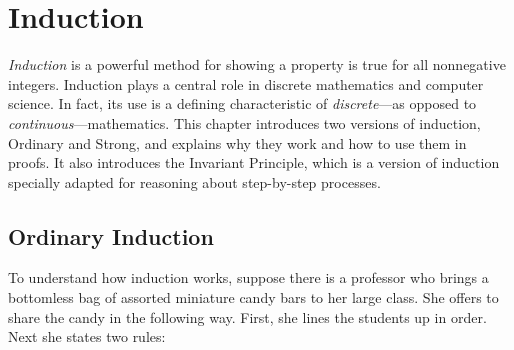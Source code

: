 \chapter{Induction}\label{induction_chap}

\emph{Induction} is a powerful method for showing a property is true
for all nonnegative integers.  Induction plays a central role in
discrete mathematics and computer science.  In fact, its use is a
defining characteristic of \emph{discrete}---as opposed to
\emph{continuous}---mathematics.  This chapter introduces two
versions of induction, Ordinary and Strong, and explains why they work
and how to use them in proofs.  It also introduces the Invariant
Principle, which is a version of induction specially adapted for
reasoning about step-by-step processes.


\iffalse
we'll introduce induction and a variant called \term{strong
induction}.  Although these two version of methods look and feel
different, it turns out that they are equivalent in the sense that a
proof using any one of the methods can be automatically reformatted so
that it becomes a proof using any of the other methods.  The choice of
which method to use is up to you and typically depends on whichever
seems to be the easiest or most natural for the problem at hand.
\fi


\section{Ordinary Induction}\label{ordinary_induct_chap}
\label{ordinary_induct_sec}

To understand how induction works, suppose there is a professor who
brings a bottomless bag of assorted miniature candy bars to her large
class.  She offers to share the candy in the following way.  First,
she lines the students up in order.  Next she states two rules:


